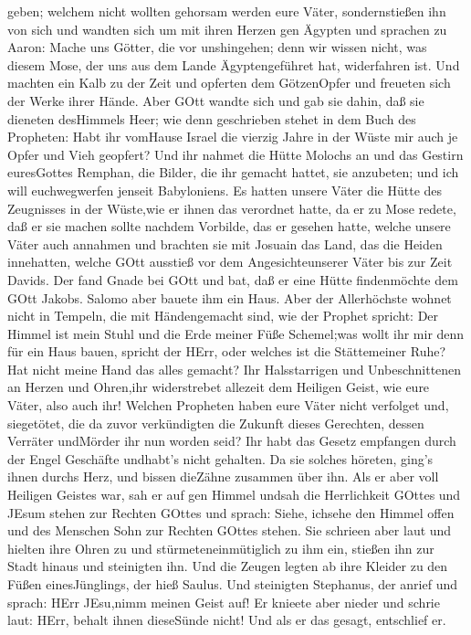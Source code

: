 geben;  welchem nicht wollten gehorsam werden eure Väter,
sondernstießen ihn von sich und wandten sich um mit ihren Herzen gen
Ägypten  und sprachen zu Aaron: Mache uns Götter, die vor
unshingehen; denn wir wissen nicht, was diesem Mose, der uns aus dem
Lande Ägyptengeführet hat, widerfahren ist.  Und machten
ein Kalb zu der Zeit und opferten dem GötzenOpfer und freueten sich der
Werke ihrer Hände.  Aber GOtt wandte sich und gab sie
dahin, daß sie dieneten desHimmels Heer; wie denn geschrieben stehet in
dem Buch des Propheten: Habt ihr vomHause Israel die vierzig Jahre in
der Wüste mir auch je Opfer und Vieh geopfert?  Und ihr
nahmet die Hütte Molochs an und das Gestirn euresGottes Remphan, die
Bilder, die ihr gemacht hattet, sie anzubeten; und ich will
euchwegwerfen jenseit Babyloniens.  Es hatten unsere Väter
die Hütte des Zeugnisses in der Wüste,wie er ihnen das verordnet hatte,
da er zu Mose redete, daß er sie machen sollte nachdem Vorbilde, das er
gesehen hatte,  welche unsere Väter auch annahmen und
brachten sie mit Josuain das Land, das die Heiden innehatten, welche
GOtt ausstieß vor dem Angesichteunserer Väter bis zur Zeit Davids.
 Der fand Gnade bei GOtt und bat, daß er eine Hütte
findenmöchte dem GOtt Jakobs.  Salomo aber bauete ihm ein
Haus.  Aber der Allerhöchste wohnet nicht in Tempeln, die
mit Händengemacht sind, wie der Prophet spricht:  Der
Himmel ist mein Stuhl und die Erde meiner Füße Schemel;was wollt ihr mir
denn für ein Haus bauen, spricht der HErr, oder welches ist die
Stättemeiner Ruhe?  Hat nicht meine Hand das alles gemacht?
 Ihr Halsstarrigen und Unbeschnittenen an Herzen und
Ohren,ihr widerstrebet allezeit dem Heiligen Geist, wie eure Väter, also
auch ihr!  Welchen Propheten haben eure Väter nicht
verfolget und, siegetötet, die da zuvor verkündigten die Zukunft dieses
Gerechten, dessen Verräter undMörder ihr nun worden seid? 
Ihr habt das Gesetz empfangen durch der Engel Geschäfte undhabt's nicht
gehalten.  Da sie solches höreten, ging's ihnen durchs
Herz, und bissen dieZähne zusammen über ihn.  Als er aber
voll Heiligen Geistes war, sah er auf gen Himmel undsah die Herrlichkeit
GOttes und JEsum stehen zur Rechten GOttes und sprach: Siehe, ichsehe
den Himmel offen und des Menschen Sohn zur Rechten GOttes stehen.
 Sie schrieen aber laut und hielten ihre Ohren zu und
stürmeteneinmütiglich zu ihm ein, stießen ihn zur Stadt hinaus und
steinigten ihn.  Und die Zeugen legten ab ihre Kleider zu
den Füßen einesJünglings, der hieß Saulus.  Und steinigten
Stephanus, der anrief und sprach: HErr JEsu,nimm meinen Geist auf!
 Er knieete aber nieder und schrie laut: HErr, behalt ihnen
dieseSünde nicht! Und als er das gesagt, entschlief er.

